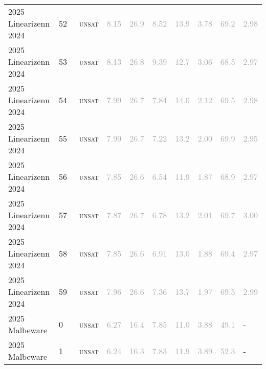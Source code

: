 \begin{center}
{\begin{longtable}{@{}llllllllll@{}}
2025 Linearizenn 2024 & 52 & ~\textsc{unsat} & \textcolor{darkgray}{8.15} & \textcolor{darkgray}{26.9} & \textcolor{darkgray}{8.52} & \textcolor{darkgray}{13.9} & \textcolor{darkgray}{3.78} & \textcolor{darkgray}{69.2} & \textcolor{darkgray}{2.98} \\
2025 Linearizenn 2024 & 53 & ~\textsc{unsat} & \textcolor{darkgray}{8.13} & \textcolor{darkgray}{26.8} & \textcolor{darkgray}{9.39} & \textcolor{darkgray}{12.7} & \textcolor{darkgray}{3.06} & \textcolor{darkgray}{68.5} & \textcolor{darkgray}{2.97} \\
2025 Linearizenn 2024 & 54 & ~\textsc{unsat} & \textcolor{darkgray}{7.99} & \textcolor{darkgray}{26.7} & \textcolor{darkgray}{7.84} & \textcolor{darkgray}{14.0} & \textcolor{darkgray}{2.12} & \textcolor{darkgray}{69.5} & \textcolor{darkgray}{2.98} \\
2025 Linearizenn 2024 & 55 & ~\textsc{unsat} & \textcolor{darkgray}{7.99} & \textcolor{darkgray}{26.7} & \textcolor{darkgray}{7.22} & \textcolor{darkgray}{13.2} & \textcolor{darkgray}{2.00} & \textcolor{darkgray}{69.9} & \textcolor{darkgray}{2.95} \\
2025 Linearizenn 2024 & 56 & ~\textsc{unsat} & \textcolor{darkgray}{7.85} & \textcolor{darkgray}{26.6} & \textcolor{darkgray}{6.54} & \textcolor{darkgray}{11.9} & \textcolor{darkgray}{1.87} & \textcolor{darkgray}{68.9} & \textcolor{darkgray}{2.97} \\
2025 Linearizenn 2024 & 57 & ~\textsc{unsat} & \textcolor{darkgray}{7.87} & \textcolor{darkgray}{26.7} & \textcolor{darkgray}{6.78} & \textcolor{darkgray}{13.2} & \textcolor{darkgray}{2.01} & \textcolor{darkgray}{69.7} & \textcolor{darkgray}{3.00} \\
2025 Linearizenn 2024 & 58 & ~\textsc{unsat} & \textcolor{darkgray}{7.85} & \textcolor{darkgray}{26.6} & \textcolor{darkgray}{6.91} & \textcolor{darkgray}{13.0} & \textcolor{darkgray}{1.88} & \textcolor{darkgray}{69.4} & \textcolor{darkgray}{2.97} \\
2025 Linearizenn 2024 & 59 & ~\textsc{unsat} & \textcolor{darkgray}{7.96} & \textcolor{darkgray}{26.6} & \textcolor{darkgray}{7.36} & \textcolor{darkgray}{13.7} & \textcolor{darkgray}{1.97} & \textcolor{darkgray}{69.5} & \textcolor{darkgray}{2.99} \\
\midrule
2025 Malbeware & 0 & ~\textsc{unsat} & \textcolor{darkgray}{6.27} & \textcolor{darkgray}{16.4} & \textcolor{darkgray}{7.85} & \textcolor{darkgray}{11.0} & \textcolor{darkgray}{3.88} & \textcolor{darkgray}{49.1} & - \\
2025 Malbeware & 1 & ~\textsc{unsat} & \textcolor{darkgray}{6.24} & \textcolor{darkgray}{16.3} & \textcolor{darkgray}{7.83} & \textcolor{darkgray}{11.9} & \textcolor{darkgray}{3.89} & \textcolor{darkgray}{52.3} & - \\

\end{longtable}}
\end{center}
